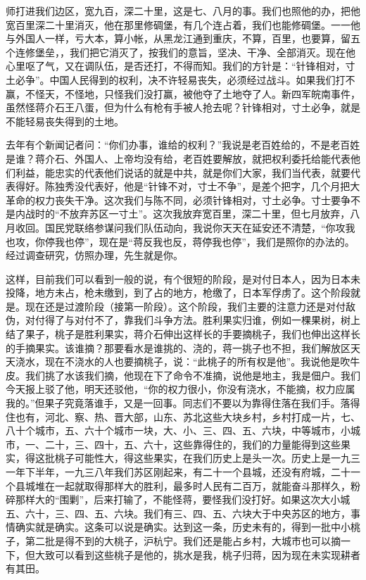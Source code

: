 师打进我们边区，宽九百，深二十里，这是七、八月的事。我们也照他的办，把他宽百里深二十里消灭，他在那里修碉堡，有几个连占着，我们也能修碉堡。一一他与外国人一样，亏大本，算小帐，从黑龙江通到重庆，不算，百里，也要算，留五个连修堡垒，，我们把它消灭了，按我们的意旨，坚决、干净、全部消灭。现在他心里呕了气，又在调队伍，是否还打，不得而知。我们的方针是：“针锋相对，寸土必争”。中国人民得到的权利，决不许轻易丧失，必须经过战斗。如果我们打不赢，不怪天，不怪地，只怪我们没打赢，被他夺了土地夺了人。新四军皖南事件，虽然怪蒋介石王八蛋，但为什么有枪有手被人抢去呢？针锋相对，寸土必争，就是不能轻易丧失得到的土地。

去年有个新闻记者问：“你们办事，谁给的权利？”我说是老百姓给的，不是老百姓是谁？蒋介石、外国人、上帝均没有给，老百姓要解放，就把权利委托给能代表他们利益，能忠实的代表他们说话的就是中共，就是你们大家，我们当代表，就要代表得好。陈独秀没代表好，他是“针锋不对，寸士不争”，是差个把字，几个月把大革命的权力丧失干净。这次我们与陈不同，必须针锋相对，寸土必争。寸士要争不是内战时的“不放弃苏区一寸土”。这次我放弃宽百里，深二十里，但七月放弃，八月收回。国民党联络参谋问我们队伍动向，我说你天天在延安还不清楚，“你攻我也攻，你停我也停”，现在是“蒋反我也反，蒋停我也停”，我们是照你的办法的。经过调查研究，仿照办理，先生就是你。

这样，目前我们可以看到一般的说，有个很短的阶段，是对付日本人，因为日本未投降，地方未占，枪未缴到，到了占的地方，枪缴了，日本军俘虏了。这个阶段就是。现在还是过渡阶段（接第一阶段）。这个阶段，我们主要的注意力还是对付敌伪，对付得了与对付不了，靠我们斗争方法。胜利果实归谁，例如一棵果树，树上结了果子，桃子是胜利果实，蒋介石伸出这样长的手要摘桃子，我们也伸出这样长的手摘果实。该谁摘？那要看水是谁挑的、浇的，蒋一挑子也不担，我们解放区天天浇水，现在不浇水的人也要摘桃子，说：“此桃子的所有权是他”。我说他是吹牛皮。我们挑了水该我们摘，他现在下了命令不准摘，说他是地主，我是佃户。我们今天报上驳了他，明天还驳他，“你的权力很小，你没有浇水，不能摘，权力应属我的。”但果子究竟落谁手，又是一回事。同志们不要以为靠得住落在我们手。落得住也有，河北、察、热、晋大部，山东、苏北这些大块乡村，乡村打成一片，七、八十个城市，五、六十个城市一块，大、小、三、四、五、六块，中等城市，小城市，一、二十，三、四十，五、六十，这些靠得住的，我们的力量能得到这些果实，得这批桃子可能性大，得这些果实，在我们历史上是头一次。历史上是一九三一年下半年，一九三八年我们苏区刚起来，有二十一个县城，还没有府城，二十一个县城堆在一起就取得那样大的胜利，最多时人民有二百万，就能奋斗那样久，粉碎那样大的“围剿”，后来打输了，不能怪蒋，要怪我们没打好。如果这次大小城五、六十，三、四、五、六块。我们有三、四、五、六块大于中央苏区的地方，事情确实就是确实。这条可以说是确实。达到这一条，历史未有的，得到一批中小桃子，第二批是得不到的大桃子，沪杭宁。我们还是能占乡村，大城市也可以摘一下，但大致可以看到这些桃子是他的，挑水是我，桃子归蒋，因为现在未实现耕者有其田。

